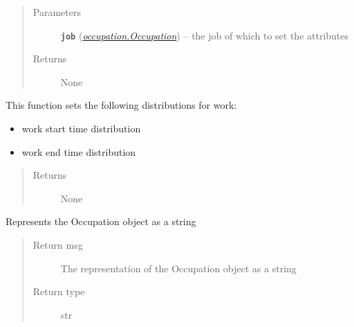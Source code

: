 \documentclass[letterpaper,10pt,english]{sphinxmanual}
\begin{document}
\begin{fulllineitems}
\begin{fulllineitems}
\begin{itemize}
\end{itemize}
\begin{quote}\begin{description}
\item[{Parameters}] \leavevmode
\textbf{\texttt{job}} ({\hyperref[occupation:occupation.Occupation]{\emph{\emph{occupation.Occupation}}}}) -- the job of which to set the attributes

\item[{Returns}] \leavevmode
None

\end{description}\end{quote}

\end{fulllineitems}


\begin{fulllineitems}
\label{occupation:occupation.Occupation.set_work_distribution}
This function sets the following distributions for work:
\begin{itemize}
\item {} 
work start time distribution

\item {} 
work end time distribution

\end{itemize}
\begin{quote}\begin{description}
\item[{Returns}] \leavevmode
None

\end{description}\end{quote}

\end{fulllineitems}


\begin{fulllineitems}
\label{occupation:occupation.Occupation.toString}
Represents the Occupation object as a string
\begin{quote}\begin{description}
\item[{Return msg}] \leavevmode
The representation of the Occupation object as a string

\item[{Return type}] \leavevmode
str


\end{description}
\end{quote}
\end{fulllineitems}
\end{fulllineitems}
\end{document}
